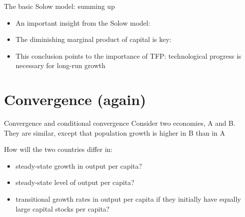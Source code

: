 \documentclass[10pt]{beamer}
\begin{document}
\begin{frame}{The basic Solow model: summing up}
    \begin{itemize}
        \item An important insight from the Solow model:
         \medskip
        \item The diminishing marginal product of capital is key:
        \item This conclusion points to the importance of TFP: technological progress is necessary for long-run growth
    \end{itemize}
\end{frame}



\section{Convergence (again)}


\begin{frame}{Convergence and conditional convergence}
    Consider two economies, A and B. They are similar, except that population growth is higher in B than in A\bigskip

    How will the two countries differ in:
    \begin{itemize}
        \item steady-state growth in output per capita?
        \item steady-state level of output per capita?
        \item transitional growth rates in output per capita if they initially have equally large capital stocks per capita? 
    \end{itemize}
\end{frame}
\end{document}
